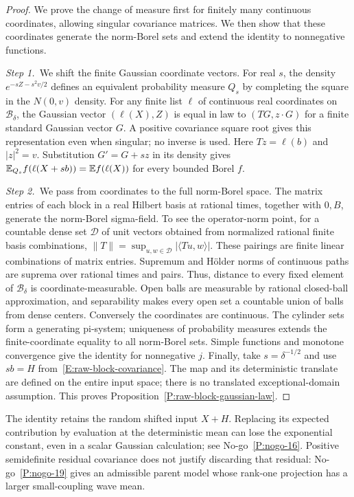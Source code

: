 \begin{proof}
  We prove the change of measure first for finitely many continuous
  coordinates, allowing singular covariance matrices. We then show that these
  coordinates generate the norm-Borel sets and extend the identity to
  nonnegative functions.


  \medskip
  \noindent\textit{Step 1.~}We shift the finite Gaussian coordinate vectors.
  For real $s$, the density $e^{-sZ-s^2v/2}$ defines an equivalent probability
  measure $Q_s$ by completing the square in the $N(0,v)$ density. For any finite
  list $\ell$ of continuous real coordinates on $\mathscr{B}_\delta$, the
  Gaussian vector $(\ell(X),Z)$ is equal in law to $(TG,z\cdot G)$ for a finite
  standard Gaussian vector $G$. A positive covariance square root gives this
  representation even when singular; no inverse is used. Here $Tz = \ell(b)$ and
  $|z|^2 = v$. Substitution $G' = G+sz$ in its density gives
  $\mathbb{E}_{Q_s}f(\ell(X+sb)) = \mathbb{E} f(\ell(X))$ for every bounded Borel $f$.


  \medskip
  \noindent\textit{Step 2.~}We pass from coordinates to the full norm-Borel
  space.
  The matrix entries of each block in a real Hilbert basis at rational times,
  together with $0,B$, generate the norm-Borel sigma-field. To see the
  operator-norm point, for a countable dense set $\mathcal{D}$ of unit vectors
  obtained from normalized rational finite basis combinations, $\|T\| =
  \sup_{u,w\in\mathcal{D}}|\langle Tu,w\rangle|$. These pairings are finite
  linear combinations of matrix entries. Supremum and H\"older norms of
  continuous paths are suprema over rational times and pairs. Thus, distance to
  every fixed element of $\mathscr{B}_\delta$ is coordinate-measurable. Open
  balls are measurable by rational closed-ball approximation, and separability
  makes every open set a countable union of balls from dense centers. Conversely
  the coordinates are continuous. The cylinder sets form a generating pi-system;
  uniqueness of probability measures extends the finite-coordinate equality to
  all norm-Borel sets. Simple functions and monotone convergence give the
  identity for nonnegative $j$. Finally, take $s = \delta^{-1/2}$ and use $sb =
  H$ from~\eqref{E:raw-block-covariance}. The map and its deterministic
  translate are defined on the entire input space; there is no translated
  exceptional-domain assumption. This proves
  Proposition~\ref{P:raw-block-gaussian-law}.
\end{proof}

The identity retains the random shifted input $X+H$. Replacing its
expected contribution by evaluation at the deterministic mean can lose
the exponential constant, even in a scalar Gaussian calculation; see
No-go~\ref{P:nogo-16}. Positive semidefinite residual covariance does not
justify discarding that residual: No-go~\ref{P:nogo-19} gives an admissible
parent model whose rank-one projection has a larger small-coupling wave mean.


